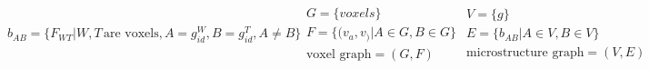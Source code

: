 \begin{subequations}

\begin{equation}
b_{AB}=\{F_{WT} | W, T\, \text{are voxels}, A = g^W_{id}, B = g^T_{id}, A \neq B\}
\label{eq:gbdef}
\end{equation}

\begin{equation}
\begin{aligned}
G=\{voxels\} \\
F=\{(v_{a}, v_) | A \in G, B \in G\} \\
\text{voxel graph} = (G, F)
\end{aligned}
\label{eq:micrograph}
\end{equation}

\begin{equation}
\begin{aligned}
V=\{g\} \\
E=\{b_{AB} | A \in V, B \in V\} \\
\text{microstructure graph} = (V, E)
\end{aligned}
\label{eq:micrograph}
\end{equation}

\end{subequations}